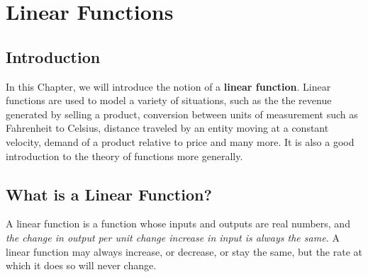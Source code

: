 

\chapter{Linear Functions}

\section*{Introduction}

        In this Chapter, we will introduce the notion of a \textbf{linear function}.  Linear functions are used to model a variety of situations, such as the the revenue generated by selling a product, conversion between units of measurement such as Fahrenheit to Celsius, distance traveled by an entity moving at a constant velocity, demand of a product relative to price and many more.  It is also a good introduction to the theory of functions more generally.


\section{What is a Linear Function?}

A linear function is a function whose inputs and outputs are real numbers, and \textit{the change in output per unit change increase in input is always the same.}  A linear function may always increase, or decrease, or stay the same, but the rate at which it does so will never change.

